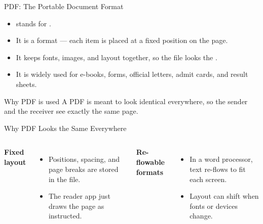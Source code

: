 \documentclass[aspectratio=169]{beamer}
\begin{document}
\begin{frame}{PDF: The Portable Document Format}
  \begin{itemize}
    \item {} stands for .
    \item It is a  format --- each item is placed at a
      fixed position on the page.
    \item It keeps fonts, images, and layout together, so the file looks the
      .
    \item It is widely used for e-books, forms, official letters, admit
      cards, and result sheets.
  \end{itemize}
  \begin{block}{Why PDF is used}
    A PDF is meant to look identical everywhere, so the sender and the
    receiver see exactly the same page.
  \end{block}
\end{frame}

\begin{frame}{Why PDF Looks the Same Everywhere}
  \begin{columns}[T]
      \textbf{Fixed layout}
      \begin{itemize}
        \item Positions, spacing, and page breaks are stored in the file.
        \item The reader app just draws the page as instructed.
      \end{itemize}
      \textbf{Re-flowable formats}
      \begin{itemize}
        \item In a word processor, text re-flows to fit each screen.
        \item Layout can shift when fonts or devices change.
      \end{itemize}
  \end{columns}
  \vspace{0.3cm}
\end{frame}
\end{document}
